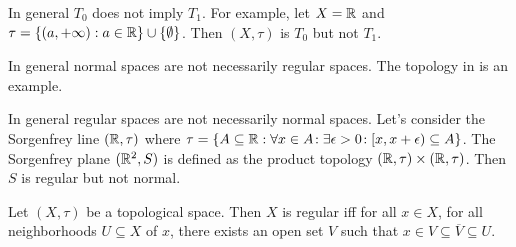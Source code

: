 \documentclass{techreport}
\begin{document}
\begin{example}\label{Exa:T0NotImplyT1}
	In general $T_0$ does not imply $T_1$.
	For example, let $X = \mathbb{R}$ and $\tau = \{ (a, +\infty) : a \in \mathbb{R} \} \cup \{ \emptyset \}$.
	Then $(X,\tau)$ is $T_0$ but not $T_1$.
\end{example}

\begin{example}\label{Exa:NormalNotImplyRegular}
	In general normal spaces are not necessarily regular spaces.
	The topology in  is an example.
\end{example}

\begin{example}\label{Exa:RegularNotImplyNormal}
	In general regular spaces are not necessarily normal spaces.
	Let's consider the Sorgenfrey line $(\mathbb{R},\tau)$ where $\tau = \{ A \subseteq \mathbb{R} : \forall {x \in A}\!: \exists {\epsilon > 0}\!: [x,x+\epsilon) \subseteq A \}$.
	The Sorgenfrey plane $(\mathbb{R}^2,S)$ is defined as the product topology $(\mathbb{R},\tau) \times (\mathbb{R},\tau)$.
	Then $S$ is regular but not normal.
\end{example}

\begin{lemma}\label{Lem:RegularIffNeighborContainClosure=======================}
	Let $(X,\tau)$ be a topological space.
	Then $X$ is regular iff for all $x \in X$, for all neighborhoods $U \subseteq X$ of $x$, there exists an open set $V$ such that $x \in V \subseteq \overline{V} \subseteq U$.
\end{lemma}


%
\end{document}

